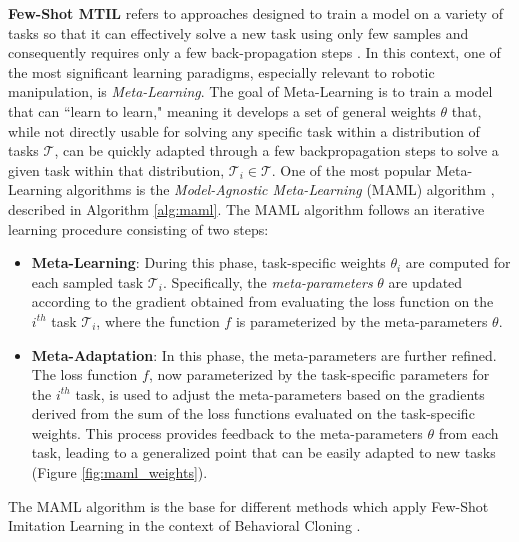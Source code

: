\textbf{Few-Shot MTIL} refers to approaches designed to train a model on a variety of tasks so that it can effectively solve a new task using only few samples and consequently requires only a few back-propagation steps \cite{finn2017maml}. In this context, one of the most significant learning paradigms, especially relevant to robotic manipulation, is \textit{Meta-Learning}. The goal of Meta-Learning is to train a model that can ``learn to learn," meaning it develops a set of general weights $\theta$ that, while not directly usable for solving any specific task within a distribution of tasks $\mathcal{T}$, can be quickly adapted through a few backpropagation steps to solve a given task within that distribution, $\mathcal{T}_{i} \in \mathcal{T}$. One of the most popular Meta-Learning algorithms is the \textit{Model-Agnostic Meta-Learning} (MAML) algorithm \cite{finn2017maml}, described in Algorithm \ref{alg:maml}. The MAML algorithm follows an iterative learning procedure consisting of two steps:
\begin{itemize}
    \item \textbf{Meta-Learning}: During this phase, task-specific weights $\theta_{i}$ are computed for each sampled task $\mathcal{T}_{i}$. Specifically, the \textit{meta-parameters} $\theta$ are updated according to the gradient obtained from evaluating the loss function on the $i^{th}$ task $\mathcal{T}_{i}$, where the function $f$ is parameterized by the meta-parameters $\theta$.

    \item \textbf{Meta-Adaptation}: In this phase, the meta-parameters are further refined. The loss function $f$, now parameterized by the task-specific parameters for the $i^{th}$ task, is used to adjust the meta-parameters based on the gradients derived from the sum of the loss functions evaluated on the task-specific weights. This process provides feedback to the meta-parameters $\theta$ from each task, leading to a generalized point that can be easily adapted to new tasks (Figure \ref{fig:maml_weights}).
\end{itemize}


The MAML algorithm is the base for different methods which apply Few-Shot Imitation Learning in the context of Behavioral Cloning \cite{finn2017one_shot_visual_il,yu2018daml,yu2018one_shot_hil}.

